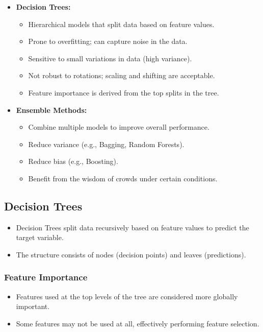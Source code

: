 \documentclass{article}
\begin{document}
\begin{itemize}
    \item \textbf{Decision Trees:}
    \begin{itemize}
        \item Hierarchical models that split data based on feature values.
        \item Prone to overfitting; can capture noise in the data.
        \item Sensitive to small variations in data (high variance).
        \item Not robust to rotations; scaling and shifting are acceptable.
        \item Feature importance is derived from the top splits in the tree.
    \end{itemize}
    \item \textbf{Ensemble Methods:}
    \begin{itemize}
        \item Combine multiple models to improve overall performance.
        \item Reduce variance (e.g., Bagging, Random Forests).
        \item Reduce bias (e.g., Boosting).
        \item Benefit from the wisdom of crowds under certain conditions.
    \end{itemize}
\end{itemize}

\subsection{Decision Trees}

\begin{itemize}
    \item Decision Trees split data recursively based on feature values to predict the target variable.
    \item The structure consists of nodes (decision points) and leaves (predictions).
\end{itemize}

\subsubsection{Feature Importance}

\begin{itemize}
    \item Features used at the top levels of the tree are considered more globally important.
    \item Some features may not be used at all, effectively performing feature selection.
\end{itemize}
\end{document}
